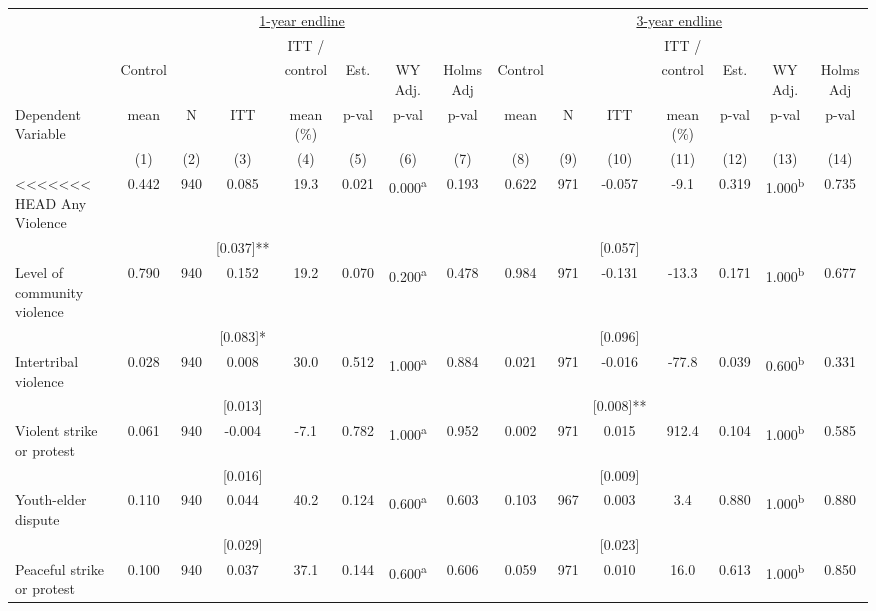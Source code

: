 \begin{tabular}{lcccccccccccccc}
\hline \noalign{\smallskip} & \multicolumn{7}{c}{\uline{\hfill 1-year endline \hfill}} & \multicolumn{7}{c}{\uline{\hfill 3-year endline \hfill}}\\
 &  &  &  & ITT / &  &  &  &  &  &  & ITT / &  &  & \\
 & Control &  &  & control & Est. & WY Adj. & Holms Adj & Control &  &  & control & Est. & WY Adj. & Holms Adj\\
Dependent Variable & mean & N & ITT & mean (\%) & p-val & p-val & p-val & mean & N & ITT & mean (\%) & p-val & p-val & p-val\\
 & (1) & (2) & (3) & (4) & (5) & (6) & (7) & (8) & (9) & (10) & (11) & (12) & (13) & (14)\\
<<<<<<< HEAD
\noalign{\smallskip}\hline \noalign{\smallskip}Any Violence & 0.442 & 940 & 0.085 & 19.3 & 0.021 & 0.000\textsuperscript{a} & 0.193 & 0.622 & 971 & -0.057 & -9.1 & 0.319 & 1.000\textsuperscript{b} & 0.735\\
 &  &  & [0.037]** &  &  &  &  &  &  & [0.057] &  &  &  & \\
Level of community violence & 0.790 & 940 & 0.152 & 19.2 & 0.070 & 0.200\textsuperscript{a} & 0.478 & 0.984 & 971 & -0.131 & -13.3 & 0.171 & 1.000\textsuperscript{b} & 0.677\\
 &  &  & [0.083]* &  &  &  &  &  &  & [0.096] &  &  &  & \\
\quad Intertribal violence & 0.028 & 940 & 0.008 & 30.0 & 0.512 & 1.000\textsuperscript{a} & 0.884 & 0.021 & 971 & -0.016 & -77.8 & 0.039 & 0.600\textsuperscript{b} & 0.331\\
 &  &  & [0.013] &  &  &  &  &  &  & [0.008]** &  &  &  & \\
\quad Violent strike or protest & 0.061 & 940 & -0.004 & -7.1 & 0.782 & 1.000\textsuperscript{a} & 0.952 & 0.002 & 971 & 0.015 & 912.4 & 0.104 & 1.000\textsuperscript{b} & 0.585\\
 &  &  & [0.016] &  &  &  &  &  &  & [0.009] &  &  &  & \\
\quad Youth-elder dispute & 0.110 & 940 & 0.044 & 40.2 & 0.124 & 0.600\textsuperscript{a} & 0.603 & 0.103 & 967 & 0.003 & 3.4 & 0.880 & 1.000\textsuperscript{b} & 0.880\\
 &  &  & [0.029] &  &  &  &  &  &  & [0.023] &  &  &  & \\
\quad Peaceful strike or protest & 0.100 & 940 & 0.037 & 37.1 & 0.144 & 0.600\textsuperscript{a} & 0.606 & 0.059 & 971 & 0.010 & 16.0 & 0.613 & 1.000\textsuperscript{b} & 0.850\\

\end{tabular}
